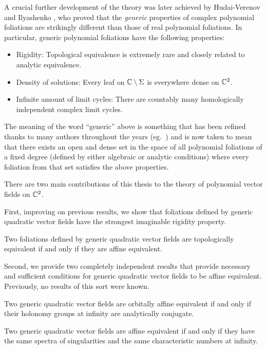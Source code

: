 \documentclass[phd,tocprelim]{cornell}
\begin{document}
A crucial further development of the theory was later achieved by Hudai-Verenov and Ilyashenko \cite{HudaiVerenov1962,Ilyashenko1978}, who proved that the \textit{generic} properties of complex polynomial foliations are strikingly different than those of real polynomial foliations. In particular, generic polynomial foliations have the following properties:
\begin{itemize}
 \item Rigidity: Topological equivalence is extremely rare and closely related to analytic equivalence.
 \item Density of solutions: Every leaf on $\mathbb{C}\setminus\Sigma$ is everywhere dense on $\mathbb{C}^2$.
 \item Infinite amount of limit cycles: There are countably many homologically independent complex limit cycles.
\end{itemize}
The meaning of the word ``generic'' above is something that has been refined thanks to many authors throughout the years (eg.~\cite{Shcherbakov1984,Nakai1994,LinsNetoSadScardua1998}) and is now taken to mean that there exists an open and dense set in the space of all polynomial foliations of a fixed degree (defined by either algebraic or analytic conditions) where every foliation from that set satisfies the above properties.

\bigskip
\noindent There are two main contributions of this thesis to the theory of polynomial vector fields on $\mathbb{C}^2$.

First, improving on previous results, we show that foliations defined by generic quadratic vector fields have the strongest imaginable rigidity property.

\begin{prefthm}
Two foliations defined by generic quadratic vector fields are topologically equivalent if and only if they are affine equivalent.  
\end{prefthm}

Second, we provide two completely independent results that provide necessary and sufficient conditions for generic quadratic vector fields to be affine equivalent. Previously, no results of this sort were known. %

\begin{prefthm}
 Two generic quadratic vector fields are orbitally affine equivalent if and only if their holonomy groups at infinity are analytically conjugate.
\end{prefthm}

\begin{prefthm}
 Two generic quadratic vector fields are affine equivalent if and only if they have the same spectra of singularities and the same characteristic numbers at infinity.
\end{prefthm}
\end{document}
